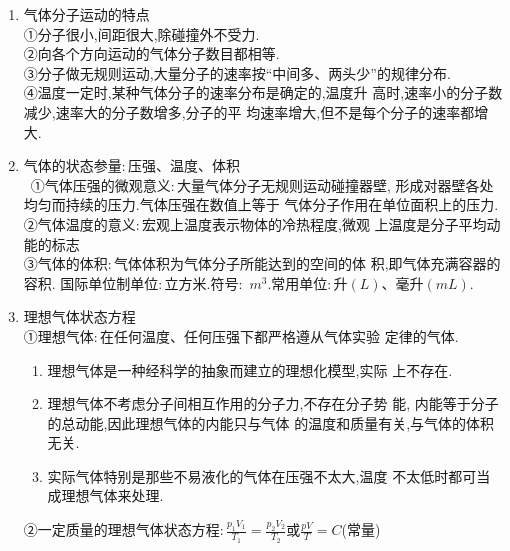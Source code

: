 \begin{enumerate}
\renewcommand{\labelenumii}{(\arabic{enumii})}

\item 
气体分子运动的特点\\
①分子很小,间距很大,除碰撞外不受力.\\
②向各个方向运动的气体分子数目都相等.\\
③分子做无规则运动,大量分子的速率按“中间多、两头少”的规律分布.\\
④温度一定时,某种气体分子的速率分布是确定的,温度升
高时,速率小的分子数减少,速率大的分子数增多,分子的平
均速率增大,但不是每个分子的速率都增大.

\item 
气体的状态参量$ : $压强、温度、体积\\\
①气体压强的微观意义$ : $大量气体分子无规则运动碰撞器壁,
形成对器壁各处均匀而持续的压力.气体压强在数值上等于
气体分子作用在单位面积上的压力.\\
②气体温度的意义$ : $宏观上温度表示物体的冷热程度,微观
上温度是分子平均动能的标志\\
③气体的体积$ : $气体体积为气体分子所能达到的空间的体
积,即气体充满容器的容积. 国际单位制单位$ : $立方米.符号$ : $
$ m^{3} $.常用单位$ : $升$ (L) $、毫升$ (mL) $.

\item 
理想气体状态方程\\
①理想气体$ : $在任何温度、任何压强下都严格遵从气体实验
定律的气体.
\begin{enumerate}
\renewcommand{\labelenumii}{\alph{enumii}.}
\item
理想气体是一种经科学的抽象而建立的理想化模型,实际
上不存在.
\item 
理想气体不考虑分子间相互作用的分子力,不存在分子势
能, 内能等于分子的总动能,因此理想气体的内能只与气体
的温度和质量有关,与气体的体积无关.
\item 
实际气体特别是那些不易液化的气体在压强不太大,温度
不太低时都可当成理想气体来处理.




\end{enumerate}
②一定质量的理想气体状态方程$: \frac { p _ { 1 } V _ { 1 } } { T _ { 1 } } = \frac { p _ { 2 } V _ { 2 } } { T _ { 2 } }$或$\frac { p V } { T } = C$(常量)


\end{enumerate}

